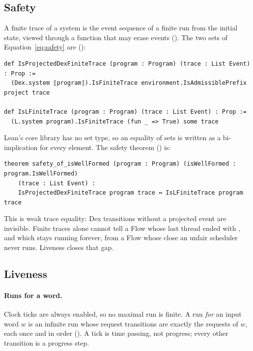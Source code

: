 \subsection{Safety}

A finite trace of a system is the event sequence of a finite run from the
initial state, viewed through a function that may erase events
(). The two sets of
Equation~\eqref{eq:safety} are ():

\begin{Verbatim}
def IsProjectedDexFiniteTrace (program : Program) (trace : List Event) : Prop :=
  (Dex.system ⟦program⟧).IsFiniteTrace environment.IsAdmissiblePrefix project trace

def IsLFiniteTrace (program : Program) (trace : List Event) : Prop :=
  (L.system program).IsFiniteTrace (fun _ => True) some trace
\end{Verbatim}

Lean's core library has no set type, so an equality of sets is written as a
bi-implication for every element. The safety theorem
() is:

\begin{Verbatim}
theorem safety_of_isWellFormed (program : Program) (isWellFormed : program.IsWellFormed)
    (trace : List Event) :
    IsProjectedDexFiniteTrace program trace ↔ IsLFiniteTrace program trace
\end{Verbatim}

This is weak trace equality: Dex transitions without a projected event are
invisible. Finite traces alone cannot tell a Flow whose last thread ended
with , and which stays running forever, from a Flow whose close
an unfair scheduler never runs. Liveness closes that gap.

\subsection{Liveness}
\label{sec:liveness-statement}

\paragraph{Runs for a word.}
Clock ticks are always enabled, so no maximal run is finite. A run
\emph{for} an input word $w$ is an infinite run whose request transitions
are exactly the requests of $w$, each once and in order
(). A tick is time passing, not progress; every other
transition is a progress step.

